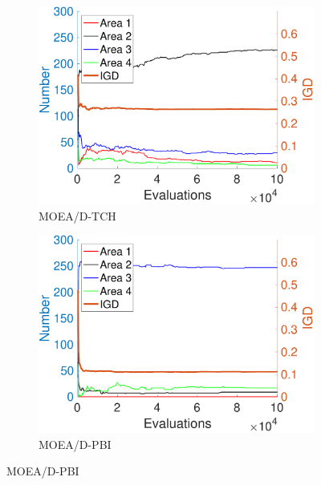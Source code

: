 \documentclass[conference]{IEEEtran}
\begin{document}
\begin{figure}[htbp]
    
    \begin{subfigure}[b]{.22\textwidth}
    \includegraphics[width=\linewidth]{Section5/dim2/Diversity/MOEAD_TCH}
    \caption{MOEA/D-TCH}
    \label{fig: MOEA/D-TCH Diversity dim=2}
    \end{subfigure}
    \begin{subfigure}[b]{.22\textwidth}
    \includegraphics[width=\linewidth]{Section5/dim2/Diversity/MOEAD_PBI}
    \caption{MOEA/D-PBI}
    \label{fig: MOEA/D-PBI Diversity dim=2}
    \end{subfigure}
    

\end{figure}
\end{document}
